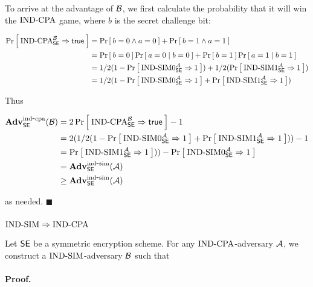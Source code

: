 To arrive at the advantage of $\advB$, we first calculate the probability
that it will win the $\INDCPA$ game, where $b$ is the secret challenge bit:

\begin{align*}
  \Prob{\INDCPA^{\advB}_{\SEscheme} \Rightarrow \ctrue}
  &= \Prob{b = 0 \wedge a = 0} + \Prob{b = 1 \wedge a = 1} \\
  &= \Prob{b = 0}\Prob{a = 0 \mid b = 0} + \Prob{b = 1}\Prob{a = 1 \mid b = 1} \\
  &= 1/2(1 - \Prob{\INDSIM0^{\advA}_{\SEscheme} \Rightarrow 1})
     + 1/2(\Prob{\INDSIM1^{\advA}_{\SEscheme} \Rightarrow 1}) \\
  &= 1/2(1 - \Prob{\INDSIM0^{\advA}_{\SEscheme} \Rightarrow 1}
          + \Prob{\INDSIM1^{\advA}_{\SEscheme} \Rightarrow 1})
\end{align*}

Thus

\begin{align*}
  \AdvINDCPA{\SEscheme}{\advB} &=
    2 \Prob{\INDCPA^{\advB}_{\SEscheme} \Rightarrow \ctrue} - 1 \\
  &= 2(1/2(1 - \Prob{\INDSIM0^{\advA}_{\SEscheme} \Rightarrow 1}
          + \Prob{\INDSIM1^{\advA}_{\SEscheme} \Rightarrow 1})) -1 \\
  &= \Prob{\INDSIM1^{\advA}_{\SEscheme} \Rightarrow 1})) -
     \Prob{\INDSIM0^{\advA}_{\SEscheme} \Rightarrow 1} \\
  &= \AdvINDSIM{\SEscheme}{\advA} \\
  &\geq \AdvINDSIM{\SEscheme}{\advA} \\
\end{align*}

as needed. $\blacksquare$


\subsubsection*{$\INDSIM \Rightarrow \INDCPA$}

Let $\SEscheme$ be a symmetric encryption scheme. For any $\INDCPA$-adversary
$\advA$, we construct a $\INDSIM$-adversary $\advB$ such that

\bnm
\AdvINDCPA{\SEscheme}{\advA}  \AdvINDSIM{\SEscheme}{\advB}
\enm

\paragraph{Proof.}


